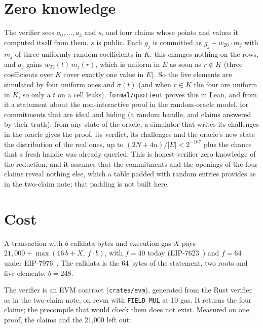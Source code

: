 \documentclass[11pt]{article}
\newcommand{\K}{K}
\newcommand{\E}{E}
\newcommand{\code}[1]{\texttt{#1}}
\newcommand{\perm}{\sigma}
\begin{document}
\section{Zero knowledge}\label{sec:zk}

The verifier sees $a_0, \dots, a_3$ and $s$, and four claims whose points and values it computed itself from them. $s$ is public. Each $g_j$ is committed as $g_j + w_{20} \cdot m_j$ with $m_j$ of three uniformly random coefficients in $\K$: this changes nothing on the rows, and $a_j$ gains $w_{22}(t) \, m_j(r)$, which is uniform in $\E$ as soon as $r \notin \K$ (three coefficients over $\K$ cover exactly one value in $\E$). So the five elements are simulated by four uniform ones and $\perm(t)$ (and when $r \in \K$ the four are uniform in $\K$, so only a $t$ on a cell leaks). \code{formal/quotient} proves this in Lean, and from it a statement about the non-interactive proof in the random-oracle model, for commitments that are ideal and hiding (a random handle, and claims answered by their truth): from any state of the oracle, a simulator that writes its challenges in the oracle gives the proof, its verdict, its challenges and the oracle's new state the distribution of the real ones, up to $(2N + 4n)/|\E| < 2^{-167}$ plus the chance that a fresh handle was already queried. This is honest-verifier zero knowledge of the reduction, and it assumes that the commitments and the openings of the four claims reveal nothing else, which a table padded with random entries provides as in the two-claim note; that padding is not built here.

\section{Cost}\label{sec:cost}

A transaction with $b$ calldata bytes and execution gas $X$ pays $21{,}000 + \max(16\, b + X,\ f \cdot b)$, with $f = 40$ today (EIP-7623~\cite{EIP7623}) and $f = 64$ under EIP-7976~\cite{EIP7976}. The calldata is the 64 bytes of the statement, two roots and five elements: $b = 248$.

The verifier is an EVM contract (\code{crates/evm}), generated from the Rust verifier as in the two-claim note, on revm with \code{FIELD\_MUL} at 10 gas. It returns the four claims; the precompile that would check them does not exist. Measured on one proof, the claims and the 21{,}000 left out:
\end{document}
